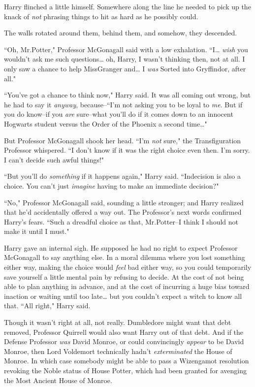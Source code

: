 Harry flinched a little himself. Somewhere along the line he needed to pick up the knack of \emph{not} phrasing things to hit as hard as he possibly could.

The walls rotated around them, behind them, and somehow, they descended.

``Oh, Mr.\?Potter," Professor McGonagall said with a low exhalation. ``I{\ldots} \emph{wish} you wouldn't ask me such questions{\ldots} oh, Harry, I wasn't thinking then, not at all. I only saw a chance to help Miss\?Granger and{\ldots} I \emph{was} Sorted into Gryffindor, after all."

``You've got a chance to think now," Harry said. It was all coming out wrong, but he had to say it \emph{anyway}, because\---``I'm not asking you to be loyal to \emph{me}. But if you do know\---if you \emph{are} sure\---what you'll do if it comes down to an innocent Hogwarts student versus the Order of the Phoenix a second time{\ldots}"

But Professor McGonagall shook her head. ``I'm \emph{not} sure," the Transfiguration Professor whispered. ``I don't know if it was the right choice even then. I'm sorry. I can't decide such awful things!"

``But you'll do \emph{something} if it happens again," Harry said. ``Indecision is also a choice. You can't just \emph{imagine} having to make an immediate decision?"

``No," Professor McGonagall said, sounding a little stronger; and Harry realized that he'd accidentally offered a way out. The Professor's next words confirmed Harry's fears. ``Such a dreadful choice as that, Mr.\?Potter\---I think I should not make it until I must."

Harry gave an internal sigh. He supposed he had no right to expect Professor McGonagall to say anything else. In a moral dilemma where you lost something either way, making the choice would \emph{feel} bad either way, so you could temporarily save yourself a little mental pain by refusing to decide. At the cost of not being able to plan anything in advance, and at the cost of incurring a huge bias toward inaction or waiting until too late{\ldots} but you couldn't expect a witch to know all that. ``All right," Harry said.

Though it wasn't right at all, not really. Dumbledore might want that debt removed, Professor Quirrell would also want Harry out of that debt. And if the Defense Professor \emph{was} David Monroe, or could convincingly \emph{appear} to be David Monroe, then Lord Voldemort technically hadn't \emph{exterminated} the House of Monroe. In which case somebody might be able to pass a Wizengamot resolution revoking the Noble status of House Potter, which had been granted for avenging the Most Ancient House of Monroe.

